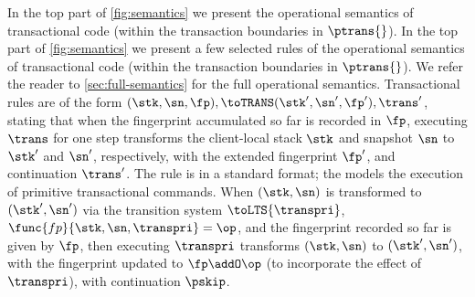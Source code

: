 \ifTechReport%
In the top part of \cref{fig:semantics} we present the operational semantics of transactional code (within the transaction boundaries in $\ptrans{}$). 
\else%
In the top part of \cref{fig:semantics} we present a few selected rules of the operational semantics of transactional code (within the transaction boundaries in $\ptrans{}$). 
We refer the reader to \cref{sec:full-semantics} for the full operational semantics.
\fi%
%
Transactional rules are of the form $(\stk, \sn, \fp), \toTRANS (\stk', \sn', \fp'), \trans'$, 
stating that when the fingerprint accumulated so far is recorded in $\fp$, 
executing $\trans$ for one step transforms the client-local stack $\stk$ 
and snapshot $\sn$ %
to $\stk'$ and $\sn'$, respectively, with the extended fingerprint $\fp'$, and continuation $\trans'$.
The  rule is in a standard format; 
the   models the execution of primitive transactional commands.
When $(\stk, \sn)$ is transformed to $(\stk', \sn')$ via the transition system $\toLTS{\transpri}$,
$\func{fp}{\stk, \sn, \transpri} = \op$, and the fingerprint recorded so far is given by $\fp$, 
then executing $\transpri$ transforms $(\stk, \sn)$ to $(\stk', \sn')$, with the fingerprint updated to $\fp \addO \op$ (to incorporate the effect of $\transpri$), with continuation $\pskip$. 







